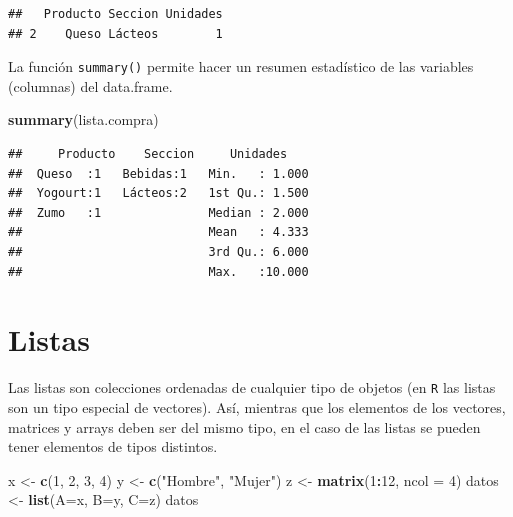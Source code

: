 \documentclass[]{book}
\newenvironment{Shaded}{\begin{snugshade}}{\end{snugshade}}
\newcommand{\KeywordTok}[1]{\textcolor[rgb]{0.13,0.29,0.53}{\textbf{#1}}}
\newcommand{\DataTypeTok}[1]{\textcolor[rgb]{0.13,0.29,0.53}{#1}}
\newcommand{\DecValTok}[1]{\textcolor[rgb]{0.00,0.00,0.81}{#1}}
\newcommand{\StringTok}[1]{\textcolor[rgb]{0.31,0.60,0.02}{#1}}
\newcommand{\OperatorTok}[1]{\textcolor[rgb]{0.81,0.36,0.00}{\textbf{#1}}}
\newcommand{\NormalTok}[1]{#1}
\begin{document}
\begin{verbatim}
##   Producto Seccion Unidades
## 2    Queso Lácteos        1
\end{verbatim}

La función \texttt{summary()} permite hacer un resumen estadístico de
las variables (columnas) del data.frame.

\begin{Shaded}
\begin{Highlighting}[]
\KeywordTok{summary}\NormalTok{(lista.compra)}
\end{Highlighting}
\end{Shaded}

\begin{verbatim}
##     Producto    Seccion     Unidades     
##  Queso  :1   Bebidas:1   Min.   : 1.000  
##  Yogourt:1   Lácteos:2   1st Qu.: 1.500  
##  Zumo   :1               Median : 2.000  
##                          Mean   : 4.333  
##                          3rd Qu.: 6.000  
##                          Max.   :10.000
\end{verbatim}

\section{Listas}\label{listas}

Las listas son colecciones ordenadas de cualquier tipo de objetos (en
\texttt{R} las listas son un tipo especial de vectores). Así, mientras
que los elementos de los vectores, matrices y arrays deben ser del mismo
tipo, en el caso de las listas se pueden tener elementos de tipos
distintos.

\begin{Shaded}
\begin{Highlighting}[]
\NormalTok{x <-}\StringTok{ }\KeywordTok{c}\NormalTok{(}\DecValTok{1}\NormalTok{, }\DecValTok{2}\NormalTok{, }\DecValTok{3}\NormalTok{, }\DecValTok{4}\NormalTok{)}
\NormalTok{y <-}\StringTok{ }\KeywordTok{c}\NormalTok{(}\StringTok{"Hombre"}\NormalTok{, }\StringTok{"Mujer"}\NormalTok{)}
\NormalTok{z <-}\StringTok{ }\KeywordTok{matrix}\NormalTok{(}\DecValTok{1}\OperatorTok{:}\DecValTok{12}\NormalTok{, }\DataTypeTok{ncol =} \DecValTok{4}\NormalTok{)}
\NormalTok{datos <-}\StringTok{ }\KeywordTok{list}\NormalTok{(}\DataTypeTok{A=}\NormalTok{x, }\DataTypeTok{B=}\NormalTok{y, }\DataTypeTok{C=}\NormalTok{z)}
\NormalTok{datos}
\end{Highlighting}
\end{Shaded}
\end{document}
